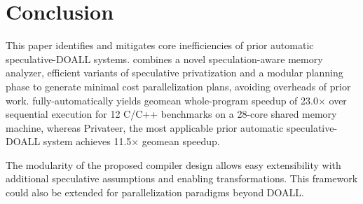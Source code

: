 \section{Conclusion}

This paper identifies and mitigates core inefficiencies of prior
automatic speculative-DOALL systems. \name combines a novel
speculation-aware memory analyzer, efficient variants of speculative
privatization and a modular planning phase to generate minimal cost
parallelization plans, avoiding overheads of prior work.
%
\name fully-automatically yields geomean whole-program speedup of
23.0$\times$ over sequential execution for 12 C/C++ benchmarks on a
28-core shared memory machine, whereas Privateer, the most applicable
prior automatic speculative-DOALL system achieves 11.5$\times$ geomean
speedup.

The modularity of the proposed compiler design allows easy
extensibility with additional speculative assumptions and enabling
transformations.
This framework could also be extended for parallelization paradigms
beyond DOALL.
